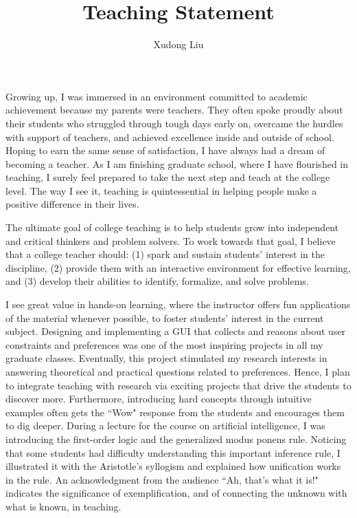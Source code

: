 \documentclass[12pt]{article}
\title{Teaching Statement}
\author{Xudong Liu}
\date{}
\begin{document}
\maketitle%

Growing up, I was immersed in an environment committed to academic achievement
because my parents were teachers.
They often spoke proudly about their students who
struggled through tough days early on, overcame the hurdles with support of teachers, and 
achieved excellence inside and outside of school. 
Hoping to earn the same sense of satisfaction, I have always had a dream of becoming a teacher.
As I am finishing graduate school, where I have flourished in teaching,
I surely feel prepared to take the next step and teach at the college level.
The way I see it,
teaching is quintessential in helping people make a positive difference in their lives.

The ultimate goal of college teaching is to help students grow into independent 
and critical thinkers and problem solvers.
To work towards that goal, I believe that a college teacher should:
(1) spark and sustain students' interest in the discipline,
(2) provide them with an interactive environment for effective learning, and
(3) develop their abilities to identify, formalize,
and solve problems.

I see great value in hands-on learning, where the instructor offers fun
applications of the material whenever possible,
to foster students' interest in the current subject.
Designing and implementing a GUI that collects and reasons about user constraints and preferences
was one of the most inspiring projects in all my graduate classes.
Eventually, this project stimulated my research interests in answering theoretical and
practical questions related to preferences.
Hence, I plan to integrate teaching with research via exciting projects that
drive the students to discover more.
Furthermore, introducing hard concepts through intuitive examples often
gets the ``Wow" response from the students and
encourages them to dig deeper.
During a lecture for the course on artificial intelligence,
I was introducing the first-order logic and the generalized modus ponens
rule.  Noticing that some students had difficulty understanding this
important inference rule, I illustrated it with the 
Aristotle's syllogism and explained how unification works in the rule.
An acknowledgment from the audience ``Ah, that's what it is!" indicates
the significance of exemplification, and of connecting the unknown with
what is known, in teaching.
\end{document}

